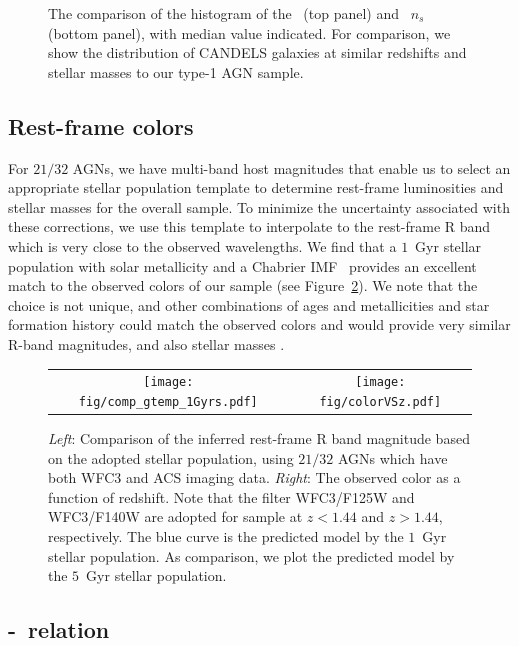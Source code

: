 \documentclass[apj]{emulateapj}
\begin{document}
\begin{figure}[ht]
\caption{\label{fig:hist_rn} 
The comparison of the histogram of the \Reff\ (top panel) and \sersic\ $n_s$ (bottom panel), with median value indicated. For comparison, we show the distribution of CANDELS galaxies at similar redshifts and stellar masses to our type-1 AGN sample.}
\end{figure} 

\subsection{Rest-frame colors}

For $21/32$ AGNs, we have multi-band host magnitudes that enable us to select an appropriate stellar population template to determine rest-frame luminosities and stellar masses for the overall sample. To minimize the uncertainty associated with these corrections, we use this template to interpolate to the rest-frame R band which is very close to the observed wavelengths.  We find that a $1$~Gyr stellar population with solar metallicity and a Chabrier IMF~\citep{Bruzual2003} provides an excellent match to the observed colors of our sample (see Figure~\ref{fig:compare_temp}). We note that the choice is not unique, and other combinations of ages and metallicities and star formation history could match the observed colors and would provide very similar R-band magnitudes, and also stellar masses \citep{Bell2000, Bell2001}. 

\begin{figure}
\centering
\begin{tabular}{c c}
{\texttt{[image: fig/comp\_gtemp\_1Gyrs.pdf]}}&
{\texttt{[image: fig/colorVSz.pdf]}}\\
\end{tabular}
\caption{\label{fig:compare_temp} 
 {\it Left}: Comparison of the inferred rest-frame R band magnitude based on the adopted stellar population, using $21/32$ AGNs which have both WFC3 and ACS imaging data.  {\it Right}: The observed color as a function of redshift. Note that the filter WFC3/F125W and WFC3/F140W are adopted for sample at $z<1.44$ and $z>1.44$, respectively. The blue curve is the predicted model by the $1$~Gyr stellar population. As comparison, we plot the predicted model by the $5$~Gyr stellar population.
}
\end{figure} 


 
\subsection{\mbh-\lhost\ relation}\label{sec:ml}
\end{document}

